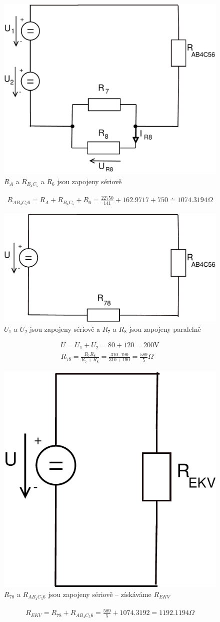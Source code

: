 \documentclass[12pt,a4paper]{article}
\begin{document}
	\begin{figure}[H]
		\center\includegraphics[width=0.6\linewidth]{obr/1_5}
		\caption*{$R_A$ a $R_{B_{4}C_{5}}$ a $R_6$ jsou zapojeny sériově}
	\end{figure}
	\begin{gather*}
		R_{AB_{4}C_{5}6} = R_A + R_{B_{4}C_{5}} + R_6 = \frac{22750}{141} + 162.9717 + 750 \doteq 1074.3194 \Omega
	\end{gather*}

	\begin{figure}[H]
		\center\includegraphics[width=0.6\linewidth]{obr/1_6}
		\caption*{$U_1$ a $U_2$ jsou zapojeny sériově a $R_7$ a $R_8$ jsou zapojeny paralelně}
	\end{figure}
	\begin{gather*}
		U = U_1 + U_2 = 80 + 120 = 200 \text{V} \\
		R_{78} = \frac{R_7 R_8}{R_7 + R_8} = \frac{310 \cdot 190}{310 + 190} = \frac{589}{5} \Omega
	\end{gather*}

	\begin{figure}[H]
		\center\includegraphics[width=0.3\linewidth]{obr/1_7}
		\caption*{$R_{78}$ a $R_{AB_{4}C_{5}6}$ jsou zapojeny sériově -- získáváme $R_{EKV}$}
	\end{figure}
	\begin{gather*}
		R_{EKV} = R_{78} + R_{AB_{4}C_{5}6} = \frac{589}{5} + 1074.3192 = 1192.1194 \Omega
	\end{gather*}
\end{document}
